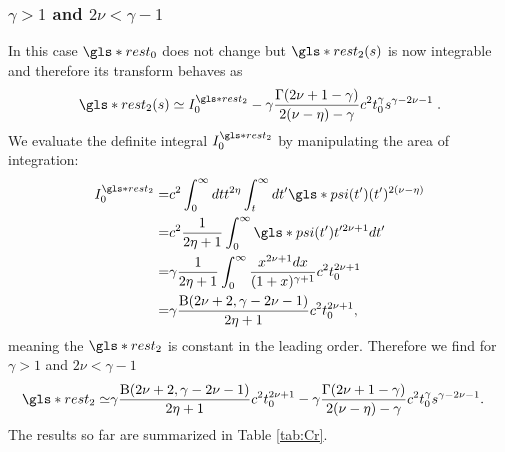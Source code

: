 \subsubsection{$\gamma>1$ and $2\nu<\gamma-1$}
In this case $\gls*{rest}_0$ does not change but $\gls*{rest}_2(s)$ is now integrable and therefore its transform behaves as
\begin{equation}
\gls*{rest}_2(s) \simeq I^{\gls*{rest}_2}_0 - \gamma \frac{\Gamma(2\nu+1-\gamma)}{2(\nu-\eta)-\gamma} c^2 t_0^\gamma s^{\gamma - 2\nu-1 } \; .
\end{equation}
We evaluate the definite integral $I^{\gls*{rest}_2}_0$ by manipulating the area of integration:
\begin{align}
 I^{\gls*{rest}_2}_0 =& c^2\int_0^\infty dt  t^{2\eta} \int_t^\infty dt' \gls*{psi}(t') (t')^{2(\nu-\eta)} \\
  =& c^2\frac{1}{2\eta+1} \int_0^\infty \gls*{psi}(t') t'^{2\nu+1} dt' \nonumber \\ 
 =& \gamma\frac{1}{2\eta+1} \int_0^\infty \frac{x^{2\nu+1}dx}{(1+x)^{\gamma+1}}c^2 t_0^{2\nu+1}  \nonumber \\
=& \gamma  \frac{\mathrm{B}(2\nu +2, \gamma - 2\nu -1)}{2\eta+1}  c^2 t_0^{2\nu+1} , 
\end{align}
meaning the $\gls*{rest}_2$ is constant in the leading order. Therefore we find for $\gamma>1$ and $2\nu<\gamma-1$
%
\begin{align}
\gls*{rest}_2 \simeq & \gamma \frac{\mathrm{B}(2\nu +2, \gamma - 2\nu -1)}{2\eta+1}  c^2 t_0^{2\nu+1}   -\gamma \frac{\Gamma(2\nu+1-\gamma)} {2(\nu-\eta)-\gamma} c^2 t_0^\gamma  s^{\gamma - 2\nu-1} .
\end{align}
%
The results so far are summarized in Table \ref{tab:Cr}.
%
